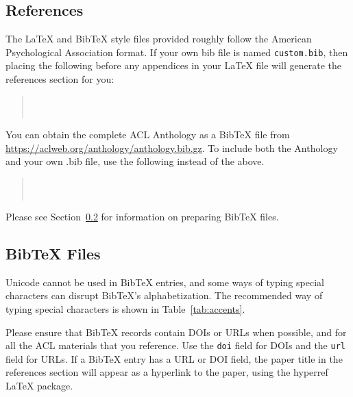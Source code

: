 \documentclass[11pt]{article}
\begin{document}
\subsection{References}

\nocite{Ando2005,borschinger-johnson-2011-particle,andrew2007scalable,rasooli-tetrault-2015,goodman-etal-2016-noise,harper-2014-learning}

The \LaTeX{} and Bib\TeX{} style files provided roughly follow the American Psychological Association format.
If your own bib file is named \texttt{custom.bib}, then placing the following before any appendices in your \LaTeX{} file will generate the references section for you:
\begin{quote}
	\begin{verbatim}
	
	
	\end{verbatim}
\end{quote}

You can obtain the complete ACL Anthology as a Bib\TeX{} file from \url{https://aclweb.org/anthology/anthology.bib.gz}.
To include both the Anthology and your own .bib file, use the following instead of the above.
\begin{quote}
	\begin{verbatim}
	
	
	\end{verbatim}
\end{quote}

Please see Section~\ref{sec:bibtex} for information on preparing Bib\TeX{} files.

\subsection{Bib\TeX{} Files}
\label{sec:bibtex}

Unicode cannot be used in Bib\TeX{} entries, and some ways of typing special characters can disrupt Bib\TeX's alphabetization. The recommended way of typing special characters is shown in Table~\ref{tab:accents}.

Please ensure that Bib\TeX{} records contain DOIs or URLs when possible, and for all the ACL materials that you reference.
Use the \verb|doi| field for DOIs and the \verb|url| field for URLs.
If a Bib\TeX{} entry has a URL or DOI field, the paper title in the references section will appear as a hyperlink to the paper, using the hyperref \LaTeX{} package.
\end{document}

